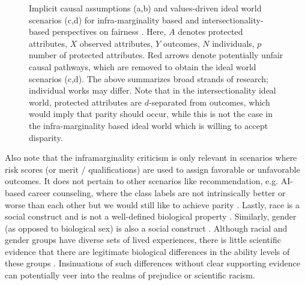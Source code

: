 \documentclass[11pt,dvipdfm]{article}
\begin{document}
\begin{figure}[t]
\caption{Implicit causal assumptions (a,b) and values-driven ideal world scenarios (c,d) for infra-marginality based \cite{corbettdavies2018measure,simoiu2017problem} and intersectionality-based \cite{crenshaw1989demarginalizing, collins2002black} perspectives on fairness \cite{foulds2020intersectional}. Here, $A$ denotes protected attributes, $X$ observed attributes, $Y$ outcomes, $N$ individuals, $p$ number of protected attributes.  Red arrows denote potentially unfair causal pathways, which are removed to obtain the ideal world scenarios (c,d). The above summarizes broad strands of research; individual works may differ. Note that in the intersectionality ideal world, protected attributes are $d$-separated from outcomes, which would imply that parity should occur, while this is not the case in the infra-marginality based ideal world which is willing to accept disparity. \label{fig:causalAssump}}
\end{figure}


Also note that the inframarginality criticism is only relevant in scenarios where risk scores (or merit / qualifications) are used to assign favorable or unfavorable outcomes.  It does not pertain to other scenarios like recommendation, e.g. AI-based career counseling, where the class labels are not intrinsically better or worse than each other but we would still like to achieve parity \cite{Zeng,islam2020neural}. Lastly, race is a social construct and is not a well-defined biological property \cite{wagner2017anthropologists}.  Similarly, gender (as opposed to biological sex) is also a social construct \cite{west1987doing}.  Although racial and gender groups have diverse sets of lived experiences, there is little scientific evidence that there are legitimate biological differences in the ability levels of these groups \cite{wagner2017anthropologists, ellemers2018gender}.  Insinuations of such differences without clear supporting evidence can potentially veer into the realms of prejudice or scientific racism.
\end{document}
